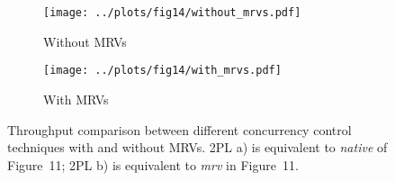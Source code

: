 \documentclass[border=2cm]{standalone}
\begin{document}
\begin{minipage}{17cm}
\vspace{1cm}

\begin{figure}[t]
	\centering
	\begin{subfigure}[t]{.35\linewidth}
		\centering
		\texttt{[image: ../plots/fig14/without\_mrvs.pdf]}
		\caption{Without MRVs}
	\end{subfigure}
	\begin{subfigure}[t]{.35\linewidth}
		\centering
		\texttt{[image: ../plots/fig14/with\_mrvs.pdf]}
		\caption{With MRVs}
	\end{subfigure}
	\caption{Throughput comparison between different concurrency control techniques with and without MRVs.
	\small \normalfont 2PL a) is equivalent to \textit{native} of Figure~11; 2PL b) is equivalent to \textit{mrv} in Figure~11.}
\end{figure}



\end{minipage}
\end{document}
